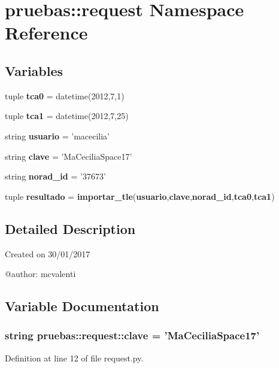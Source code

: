 \section{pruebas\-:\-:request \-Namespace \-Reference}
\label{namespacepruebas_1_1request}
\subsection*{\-Variables}
\begin{DoxyCompactItemize}
\item 
tuple {\bf tca0} = datetime(2012,7,1)
\item 
tuple {\bf tca1} = datetime(2012,7,25)
\item 
string {\bf usuario} = 'macecilia'
\item 
string {\bf clave} = '\-Ma\-Cecilia\-Space17'
\item 
string {\bf norad\-\_\-id} = '37673'
\item 
tuple {\bf resultado} = {\bf importar\-\_\-tle}({\bf usuario},{\bf clave},{\bf norad\-\_\-id},{\bf tca0},{\bf tca1})
\end{DoxyCompactItemize}


\subsection{\-Detailed \-Description}
\begin{DoxyVerb}
Created on 30/01/2017

@author: mcvalenti
\end{DoxyVerb}
 

\subsection{\-Variable \-Documentation}
\subsubsection[{clave}]{\setlength{\rightskip}{0pt plus 5cm}string {\bf pruebas\-::request\-::clave} = '\-Ma\-Cecilia\-Space17'}\label{namespacepruebas_1_1request_aa7f819a84db7c53517820d4eeb7d597e}


\-Definition at line 12 of file request.\-py.

